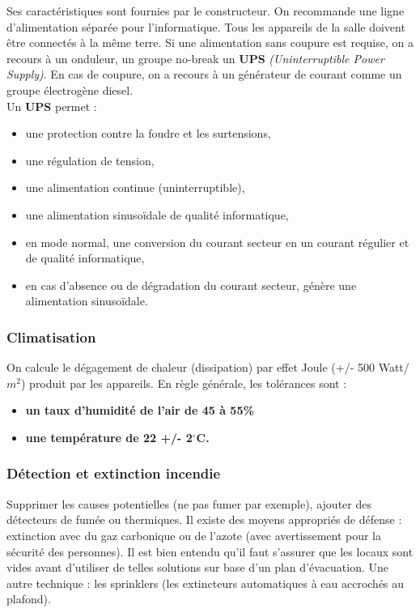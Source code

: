 \documentclass[10pt,a4paper,oneside,titlepage]{report}
\newcommand{\titre}[1]{\textcolor{title}{#1}}
\newcommand{\strong}[1]{\textbf{\titre{#1}}}
\begin{document}
\begin{sffamily}
Ses caractéristiques sont fournies par le constructeur. On recommande une ligne d'alimentation séparée pour l'informatique. Tous les appareils de la salle doivent \^etre connectés à la m\^eme terre. Si une alimentation sans coupure est requise, on a 
recours à un onduleur, un groupe no-break un \strong{UPS} \textit{(Uninterruptible Power Supply)}. En cas de coupure, on a recours à un générateur de courant comme un groupe électrogène diesel.\\

Un \textbf{UPS} permet :\begin{itemize}
\item une protection contre la foudre et les surtensions,
\item une régulation de tension,
\item une alimentation continue (uninterruptible),
\item une alimentation sinusoïdale de qualité informatique,
\item en mode normal, une conversion du courant secteur en un courant régulier et de qualité informatique,
\item en cas d'absence ou de dégradation du courant secteur, génère une alimentation sinusoïdale.
\end{itemize}

\subsubsection{Climatisation}

On calcule le dégagement de chaleur (dissipation) par effet Joule (+/- 500 Watt/$m^2$) produit par les appareils. En règle générale, les tolérances sont : \begin{itemize}
\item \textbf{un taux d'humidité de l'air de 45 à 55\%}
\item \textbf{une température de 22 +/- 2$^\circ$C.}
\end{itemize}

\subsubsection{Détection et extinction incendie}

Supprimer les causes potentielles (ne pas fumer par exemple), ajouter des détecteurs de fumée ou thermiques. Il existe des moyens appropriés de défense : extinction avec du gaz carbonique ou de l'azote (avec avertissement pour la sécurité des 
personnes). Il est bien entendu qu'il faut s'assurer que les locaux sont vides avant d'utiliser de telles solutions sur base d'un plan d'évacuation. Une autre technique : les sprinklers (les extincteurs automatiques à eau accrochés au plafond).


\end{sffamily}
\end{document}
